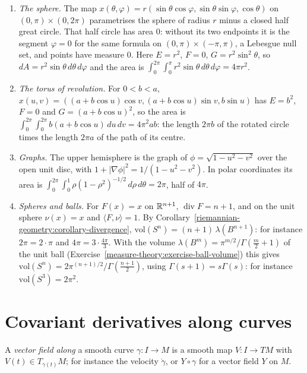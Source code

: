 \begin{example}\label{riemannian-geometry:example-areas}
\begin{enumerate}
\item \emph{The sphere.} The map $x(\theta, \varphi) = r(\sin\theta\cos\varphi, \sin\theta\sin\varphi, \cos\theta)$ on $(0, \pi) \times (0, 2\pi)$ parametrises the sphere of
radius $r$ minus a closed half great circle. That half circle has area $0$: without its two endpoints it is the segment $\varphi = 0$ for the same formula on
$(0, \pi) \times (-\pi, \pi)$, a Lebesgue null set, and points have measure $0$. Here $E = r^2$, $F = 0$, $G = r^2\sin^2\theta$, so $dA = r^2\sin\theta\,d\theta\,d\varphi$
and the area is $\int_0^{2\pi}\int_0^\pi r^2\sin\theta\,d\theta\,d\varphi = 4\pi r^2$.
\item \emph{The torus of revolution.} For $0 < b < a$, $x(u, v) = ((a + b\cos u)\cos v, (a + b\cos u)\sin v, b\sin u)$ has $E = b^2$, $F = 0$ and
$G = (a + b\cos u)^2$, so the area is $\int_0^{2\pi}\int_0^{2\pi}b(a + b\cos u)\,du\,dv = 4\pi^2ab$: the length $2\pi b$ of the rotated circle times the length $2\pi a$
of the path of its centre.
\item \emph{Graphs.} The upper hemisphere is the graph of $\phi = \sqrt{1 - u^2 - v^2}$ over the open unit disc, with $1 + |\nabla\phi|^2 = 1/(1 - u^2 - v^2)$. In polar
coordinates its area is $\int_0^{2\pi}\int_0^1\rho(1 - \rho^2)^{-1/2}\,d\rho\,d\theta = 2\pi$, half of $4\pi$.
\item \emph{Spheres and balls.} For $F(x) = x$ on $\mathbb{R}^{n+1}$, $\operatorname{div}F = n + 1$, and on the unit sphere $\nu(x) = x$ and $\langle F, \nu\rangle = 1$. By
Corollary~\ref{riemannian-geometry:corollary-divergence}, $\mathrm{vol}(S^n) = (n + 1)\,\lambda(B^{n+1})$: for instance $2\pi = 2 \cdot \pi$ and
$4\pi = 3 \cdot \frac{4\pi}{3}$. With the volume $\lambda(B^m) = \pi^{m/2}/\Gamma(\frac m2 + 1)$ of the unit ball (Exercise~\ref{measure-theory:exercise-ball-volume}) this gives
$\mathrm{vol}(S^n) = 2\pi^{(n+1)/2}/\Gamma(\frac{n+1}2)$, using $\Gamma(s + 1) = s\Gamma(s)$: for instance $\mathrm{vol}(S^3) = 2\pi^2$.
\end{enumerate}
\end{example}

\section{Covariant derivatives along curves}\label{riemannian-geometry:section-along-curves}

A \emph{vector field along} a smooth curve $\gamma \colon I \to M$ is a smooth map $V \colon I \to TM$ with $V(t) \in T_{\gamma(t)}M$; for instance the velocity $\dot\gamma$, or $Y \circ \gamma$ for a vector field $Y$ on $M$.


